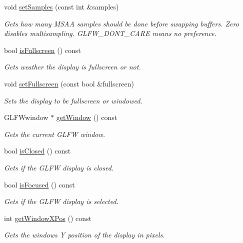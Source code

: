 \begin{DoxyCompactItemize}
void \hyperlink{classflounder_1_1display_ae1bf2028faaf411fedc80ca511a2e739}{set\+Samples} (const int \&samples)
\begin{DoxyCompactList}\small\item\em Gets how many M\+S\+AA samples should be done before swapping buffers. Zero disables multisampling. G\+L\+F\+W\+\_\+\+D\+O\+N\+T\+\_\+\+C\+A\+RE means no preference. \end{DoxyCompactList}\item 
bool \hyperlink{classflounder_1_1display_acfae3246461b74303af0513aedbee9f1}{is\+Fullscreen} () const
\begin{DoxyCompactList}\small\item\em Gets weather the display is fullscreen or not. \end{DoxyCompactList}\item 
void \hyperlink{classflounder_1_1display_ae5ee27f982e6a947305dc6e71a23021b}{set\+Fullscreen} (const bool \&fullscreen)
\begin{DoxyCompactList}\small\item\em Sets the display to be fullscreen or windowed. \end{DoxyCompactList}\item 
G\+L\+F\+Wwindow $\ast$ \hyperlink{classflounder_1_1display_af3e45d90f3cf5f0bdc82440790590902}{get\+Window} () const
\begin{DoxyCompactList}\small\item\em Gets the current G\+L\+FW window. \end{DoxyCompactList}\item 
bool \hyperlink{classflounder_1_1display_ae198b698af936bc35d9e1dcf05acbe49}{is\+Closed} () const
\begin{DoxyCompactList}\small\item\em Gets if the G\+L\+FW display is closed. \end{DoxyCompactList}\item 
bool \hyperlink{classflounder_1_1display_a197dd99a738c485bc6d941c592e8190b}{is\+Focused} () const
\begin{DoxyCompactList}\small\item\em Gets if the G\+L\+FW display is selected. \end{DoxyCompactList}\item 
int \hyperlink{classflounder_1_1display_aa3fe6abea98c07ce3dbbb01ea6d3eceb}{get\+Window\+X\+Pos} () const
\begin{DoxyCompactList}\small\item\em Gets the windows Y position of the display in pixels. \end{DoxyCompactList}\item 

\end{DoxyCompactItemize}
